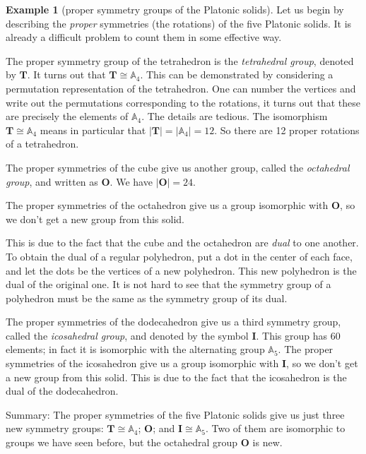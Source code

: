 \documentclass[11pt]{article}
\theoremstyle{definition}
\newtheorem{example}[thm]{Example}
\newcommand{\Alt}{\mathbb{A}}
\begin{document}
\begin{example}[proper symmetry groups of the Platonic solids]
Let us begin by describing the {\em proper} symmetries (the rotations)
of the five Platonic solids. It is already a difficult problem to
count them in some effective way.

The proper symmetry group of the tetrahedron is the {\em tetrahedral
  group}, denoted by $\mathbf{T}$.  It turns
out that $\mathbf{T} \cong \Alt_4$. This can be demonstrated by
considering a permutation representation of the tetrahedron. One can
number the vertices and write out the permutations corresponding to
the rotations, it turns out that these are precisely the elements of
$\Alt_4$. The details are tedious.  The isomorphism $\mathbf{T} \cong
\Alt_4$ means in particular that $|\mathbf{T}| = |\Alt_4| = 12$. So
there are 12 proper rotations of a tetrahedron.

The proper symmetries of the cube give us another group, called the
{\em octahedral group}, and written as
$\mathbf{O}$. We have $|\mathbf{O}| = 24$.

The proper symmetries of the octahedron give us a group isomorphic
with $\mathbf{O}$, so we don't get a new group from this solid. 

This is due to the fact that the cube and the octahedron are {\em
  dual} to one another. To obtain the dual of a regular polyhedron,
put a dot in the center of each face, and let the dots be the vertices
of a new polyhedron.  This new polyhedron is the dual of the original
one. It is not hard to see that the symmetry group of a polyhedron
must be the same as the symmetry group of its dual.

The proper symmetries of the dodecahedron give us a third symmetry
group, called the {\em icosahedral group},
and denoted by the symbol $\mathbf{I}$. This group has $60$ elements;
in fact it is isomorphic with the alternating group $\Alt_5$.  The
proper symmetries of the icosahedron give us a group isomorphic with
$\mathbf{I}$, so we don't get a new group from this solid. This is due
to the fact that the icosahedron is the dual of the dodecahedron.


Summary: The proper symmetries of the five Platonic solids give us
just three new symmetry groups: $\mathbf{T}\cong \Alt_4$;
$\mathbf{O}$; and $\mathbf{I}\cong \Alt_5$. Two of them are isomorphic
to groups we have seen before, but the octahedral group $\mathbf{O}$
is new.
\end{example}
\end{document}
